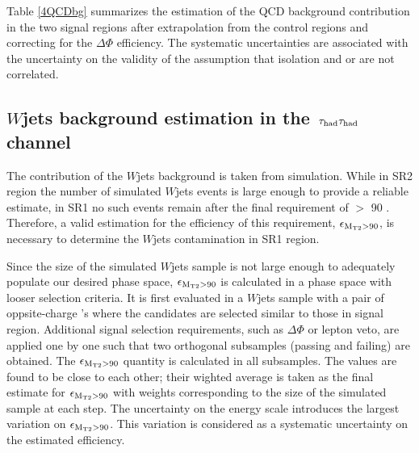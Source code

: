 Table \ref{4QCDbg} 
summarizes the estimation of the QCD background contribution in the two signal regions after extrapolation from the control regions and 
correcting for the $\Delta \Phi$ efficiency.  
The systematic uncertainties are associated with the uncertainty on the validity 
of the assumption that isolation and \mttwo or \SumMT are not correlated.


\subsection{\texorpdfstring{$W$jets background estimation in the $\,\tau_{\rm had}\tau_{\rm had}$ channel}{Wjets background estimation in the tau-tau channel}}
The contribution of the $W$jets background is taken from simulation. %
While in SR2 region the number of simulated $W$jets events is large enough to provide a reliable estimate, in SR1 no such events remain after the final requirement of \mttwo $>$ 90 \GeV. Therefore, a valid estimation for the efficiency of this requirement, $\epsilon_{\rm M_{T2}>90}$, is necessary to determine the $W$jets contamination in SR1 region.

Since the size of the simulated $W$jets sample is not large enough to adequately populate our desired phase space, $\epsilon_{\rm M_{T2}>90}$ is calculated in a phase space with looser selection criteria. It is first evaluated in a $W$jets sample with a pair of oppsite-charge \Tau's where the \Tau candidates are selected similar to those in signal region. Additional signal selection requirements, such as $\Delta \Phi$ or lepton veto, are applied one by one such that two orthogonal subsamples (passing and failing) are obtained. The $\epsilon_{\rm M_{T2}>90}$ quantity is calculated in all subsamples. The values are found to be close to each other; their wighted average is taken as the final estimate for $\epsilon_{\rm M_{T2}>90}$ with weights corresponding to the size of the simulated sample at each step. The uncertainty on the \Tau energy scale introduces the largest variation on $\epsilon_{\rm M_{T2}>90}$. This variation is considered as a systematic uncertainty on the estimated efficiency.

